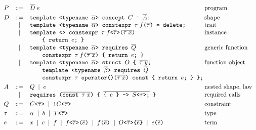 \begin{figure}[!htbp]
\[
\begin{array}{lcl@{\hspace{0.2em}}l}
P &::=& \overline{D}\; e & \text{program} \\[3pt]
D &::=& \texttt{template <typename }\overline{\alpha}\texttt{> concept } C \texttt{ = } \overline{A}\texttt{;} & \text{shape} \\
  & \mid & \texttt{template <typename }\overline{\alpha}\texttt{> constexpr } \tau\; f\texttt{(}\overline{\tau}\texttt{) = delete;} & \text{trait} \\
  & \mid & \texttt{template <> constexpr } \tau\; f\texttt{<}\overline{\tau}\texttt{>(}\overline{\tau\; x}\texttt{)} & \text{instance} \\
  &   & \qquad \texttt{\{ return } e\texttt{; \}} & \\
  & \mid & \texttt{template <typename }\overline{\alpha}\texttt{> requires } \overline{Q} & \text{generic function} \\
  &   & \qquad \texttt{constexpr } \tau\; f\texttt{(}\overline{\tau\; x}\texttt{) \{ return } e\texttt{; \}} & \\
  & \mid & \texttt{template <typename }\overline{\alpha}\texttt{> struct } O \texttt{ \{ } \overline{\tau\; y}\texttt{;} & \text{function object} \\
  &   & \qquad \texttt{template <typename }\overline{\beta}\texttt{> requires } \overline{Q} & \\
  &   & \qquad \texttt{constexpr } \tau \texttt{ operator()(}\overline{\tau\; x}\texttt{) const \{ return } e\texttt{; \} \};} & \\[3pt]
A &::=& Q \;\mid\; e & \text{nested shape, law} \\
  & \mid & \texttt{requires (}\overline{\texttt{const }\tau\; x}\texttt{) \{ } \overline{\texttt{\{ }e\texttt{ \} -> }S\texttt{<}\tau\texttt{>;}} \texttt{ \}} & \text{required calls} \\[3pt]
Q &::=& C\texttt{<}\overline{\tau}\texttt{>} \;\mid\; \texttt{!}C\texttt{<}\overline{\tau}\texttt{>} & \text{constraint} \\[3pt]
\tau &::=& \alpha \;\mid\; b \;\mid\; T\texttt{<}\overline{\tau}\texttt{>} & \text{type} \\[3pt]
e &::=& x \;\mid\; c \;\mid\; f \;\mid\; f\texttt{<}\overline{\tau}\texttt{>(}\overline{e}\texttt{)} \;\mid\; f\texttt{(}\overline{e}\texttt{)} \;\mid\; O\texttt{<}\overline{\tau}\texttt{>\{}\overline{e}\texttt{\}} \;\mid\; e\texttt{(}\overline{e}\texttt{)} & \text{term} \\

\end{array}\]
\end{figure}
